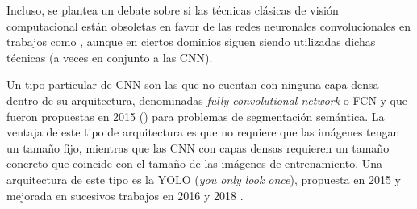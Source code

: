 Incluso, se plantea un debate sobre si las técnicas clásicas de visión computacional están obsoletas en favor de las redes neuronales convolucionales en trabajos como \cite{art:o2019deep}, aunque en ciertos dominios siguen siendo utilizadas dichas técnicas (a veces en conjunto a las CNN).

Un tipo particular de CNN son las que no cuentan con ninguna capa densa dentro de su arquitectura, denominadas \textit{fully convolutional network} o FCN y que fueron propuestas en 2015 (\citet{art:FCN2015}) para problemas de segmentación semántica. La ventaja de este tipo de arquitectura es que no requiere que las imágenes tengan un tamaño fijo, mientras que las CNN con capas densas requieren un tamaño concreto que coincide con el tamaño de las imágenes de entrenamiento. Una arquitectura de este tipo es la YOLO (\textit{you only look once}), propuesta en 2015 \cite{art:yolo} y mejorada en sucesivos trabajos en 2016 \cite{art:yolo2} y 2018 \cite{art:yolo3}.

\newpage